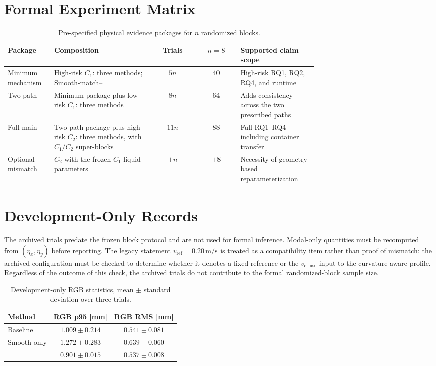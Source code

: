\section{Formal Experiment Matrix}

\begin{table}[t]
  \centering
  \scriptsize
  \caption{Pre-specified physical evidence packages for $n$ randomized blocks.}
  \begin{tabular}{@{}p{0.15\linewidth}p{0.32\linewidth}ccp{0.25\linewidth}@{}}
    \toprule
    Package & Composition & Trials & $n=8$ & Supported claim scope \\
    \midrule
    Minimum mechanism & High-risk $C_1$: three methods; Smooth-match--\SMPCC{} & $5n$ & 40 & High-risk RQ1, RQ2, RQ4, and runtime \\
    Two-path & Minimum package plus low-risk $C_1$: three methods & $8n$ & 64 & Adds consistency across the two prescribed paths \\
    Full main & Two-path package plus high-risk $C_2$: three methods, with $C_1/C_2$ super-blocks & $11n$ & 88 & Full RQ1--RQ4 including container transfer \\
    Optional mismatch & $C_2$ with the frozen $C_1$ liquid parameters & $+n$ & $+8$ & Necessity of geometry-based reparameterization \\
    \bottomrule
  \end{tabular}
\end{table}

\section{Development-Only Records}

The archived trials predate the frozen block protocol and are not used for
formal inference. Modal-only quantities must be recomputed from
$(\eta_x,\eta_y)$ before reporting.
The legacy statement $v_{\mathrm{ref}}=0.20\,\mathrm{m/s}$ is treated as a
compatibility item rather than proof of mismatch: the archived configuration
must be checked to determine whether it denotes a fixed reference or the
$v_{\mathrm{cruise}}$ input to the curvature-aware profile. Regardless of the
outcome of this check, the archived trials do not contribute to the formal
randomized-block sample size.

\begin{table}[t]
  \centering
  \scriptsize
  \caption{Development-only RGB statistics, mean $\pm$ standard deviation over three trials.}
  \begin{tabular}{@{}lcc@{}}
    \toprule
    Method & RGB p95 [mm] & RGB RMS [mm] \\
    \midrule
    Baseline & $1.009\pm0.214$ & $0.541\pm0.081$ \\
    Smooth-only & $1.272\pm0.283$ & $0.639\pm0.060$ \\
    \SMPCC{} & $0.901\pm0.015$ & $0.537\pm0.008$ \\
    \bottomrule
  \end{tabular}
\end{table}

